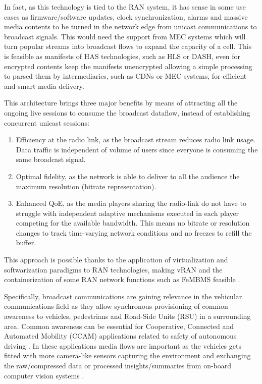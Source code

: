 In fact, as this technology is tied to the RAN system, it has sense in some use cases as firmware/software updates, clock synchronization, alarms and massive media contents to be turned in the network edge from unicast communications to broadcast signals. This would need the support from MEC systems which will turn popular streams into broadcast flows to expand the capacity of a cell. This is feasible as manifests of HAS technologies, such as HLS or DASH, even for encrypted contents keep the manifests unencrypted allowing a simple processing to parsed them by intermediaries, such as CDNs or MEC systems, for efficient and smart media delivery.

This architecture brings three major benefits by means of attracting all the ongoing live sessions to consume the broadcast dataflow, instead of establishing concurrent unicast sessions:

\begin{enumerate}
	\item Efficiency at the radio link, as the broadcast stream reduces radio link usage. Data traffic is independent of volume of users since everyone is consuming the same broadcast signal.
	\item Optimal fidelity, as the network is able to deliver to all the audience the maximum resolution (bitrate representation).
	\item Enhanced QoE, as the media players sharing the radio-link do not have to struggle with independent adaptive mechanisms executed in each player competing for the available bandwidth. This means no bitrate or resolution changes to track time-varying network conditions and no freezes to refill the buffer.
\end{enumerate}

This approach is possible thanks to the application of virtualization and softwarization paradigms to RAN technologies, making vRAN and the containerization of some RAN network functions such as FeMBMS feasible \cite{Gabilondo2020}.

Specifically, broadcast communications are gaining relevance in the vehicular communications field as they allow synchronous provisioning of common awareness to vehicles, pedestrians and Road-Side Units (RSU) in a surrounding area. Common awareness can be essential for Cooperative, Connected and Automated Mobility (CCAM) applications related to safety of autonomous driving \cite{Ma2020}. In these applications media flows are important as the vehicles gets fitted with more camera-like sensors capturing the environment and exchanging the raw/compressed data or processed insights/summaries from on-board computer vision systems \cite{Velez2020}.

